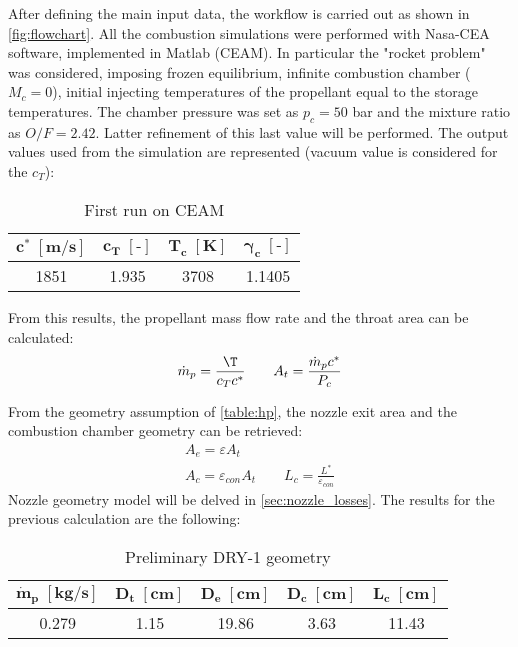 After defining the main input data, the workflow is carried out as shown in \autoref{fig:flowchart}. All the combustion simulations were performed with Nasa-CEA software, implemented in Matlab (CEAM). In particular the "rocket problem" was considered, imposing frozen equilibrium, infinite combustion chamber ($M_c = 0$), initial injecting temperatures of the propellant equal to the storage temperatures. The chamber pressure was set as $p_c = 50$ bar and the mixture ratio as $O/F = 2.42$. Latter refinement of this last value will be performed. The output values used from the simulation are represented (vacuum value is considered for the $c_T$):
\begin{table}[H]
    \renewcommand{\arraystretch}{1.2}
    \centering
    \begin{tabular}{|c|c|c|c|}
        \hline
        $\boldsymbol{c^* \; [\textbf{m/s}]}$ & $\boldsymbol{c_T \; [\textbf{-}]}$ & $\boldsymbol{T_c \; [\textbf{K}]}$ & $\boldsymbol{\gamma_c \; [\textbf{-}]}$ \\
        \hline
        \hline
        1851 & 1.935 & 3708 & 1.1405 \\
        \hline
    \end{tabular}
    \caption{First run on CEAM}
    \label{table:out_CEA_1}
\end{table}

From this results, the propellant mass flow rate and the throat area can be calculated:
\begin{equation}
    \dot{m}_p = \frac{\T}{c_T c^*} 
    \qquad 
    A_t = \frac{\dot{m}_p c^*}{P_c}
\end{equation}

From the geometry assumption of \autoref{table:hp}, the nozzle exit area and the combustion chamber geometry can be retrieved:
\begin{gather}
    A_e = \varepsilon A_t
    \\
    A_c = \varepsilon_{con} A_t \qquad L_c = \frac{L^*}{\varepsilon_{con}}
\end{gather}
Nozzle geometry model will be delved in \autoref{sec:nozzle_losses}. The results for the previous calculation are the following:

\begin{table}[H]
    \renewcommand{\arraystretch}{1.2}
    \centering
    \begin{tabular}{|c|c|c|c|c|}
        \hline
        $\boldsymbol{\dot{m}_p \; [\textbf{kg/s}]}$ & $\boldsymbol{D_t \; [\textbf{cm}]}$ & $\boldsymbol{D_e \; [\textbf{cm}]}$  & $\boldsymbol{D_{c} \; [\textbf{cm}]}$ & $\boldsymbol{L_c \; [\textbf{cm}]}$ \\
        \hline
        \hline
        0.279 & 1.15 & 19.86 & 3.63 & 11.43 \\
        \hline
    \end{tabular}
    \caption{Preliminary DRY-1 geometry}
    \label{table:preliminary_dry}
\end{table}

